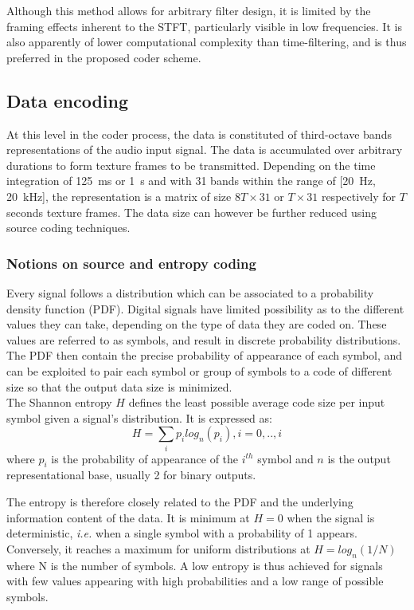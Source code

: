 \documentclass[12pt,times,onecolumn]{article}
\begin{document}
Although this method allows for arbitrary filter design, it is limited by the framing effects inherent to the STFT, particularly visible in low frequencies. It is also apparently of lower computational complexity than time-filtering, and is thus preferred in the proposed coder scheme.

\subsection{Data encoding}
At this level in the coder process, the data is constituted of third-octave bands representations of the audio input signal. The data is accumulated over arbitrary durations to form texture frames to be transmitted. Depending on the time integration of 125~ms or 1~s and with 31 bands within the range of [20~Hz, 20~kHz], the representation is a matrix of size $8T\times 31$ or $T\times 31$ respectively for $T$ seconds texture frames. The data size can however be further reduced using source coding techniques.

\subsubsection{Notions on source and entropy coding}
Every signal follows a distribution which can be associated to a probability density function (PDF). Digital signals have limited possibility as to the different values they can take, depending on the type of data they are coded on. These values are referred to as symbols, and result in discrete probability distributions. The PDF then contain the precise probability of appearance of each symbol, and can be exploited to pair each symbol or group of symbols to a code of different size so that the output data size is minimized.\\

The Shannon entropy $H$ defines the least possible average code size per input symbol given a signal's distribution. It is expressed as:
\begin{equation}
H = \sum\limits_i p_ilog_n(p_i), i = 0,..,i
\end{equation}
where $p_i$ is the probability of appearance of the $i^{th}$ symbol and $n$ is the output representational base, usually 2 for binary outputs.

The entropy is therefore closely related to the PDF and the underlying information content of the data. It is minimum at $H = 0$ when the signal is deterministic, \textit{i.e.} when a single symbol with a probability of 1 appears. Conversely, it reaches a maximum for uniform distributions at $H = log_n(1/N)$ where N is the number of symbols. A low entropy is thus achieved for signals with few values appearing with high probabilities and a low range of possible symbols.\\
\end{document}
